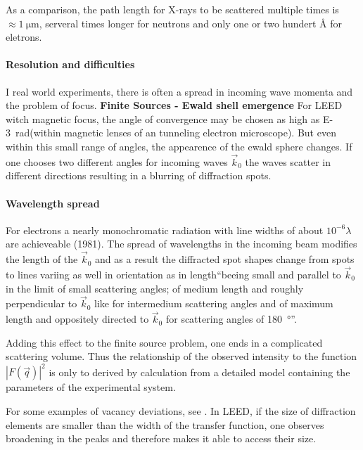 As a comparison, the path length for X-rays to be scattered multiple times is $\approx \SI{1}{\micro \meter}$, serveral times longer for neutrons and only one or two hundert \si{\angstrom} for eletrons\cite[90]{cowley_diffraction_1981}.

\paragraph{Resolution and difficulties}
I real world experiments, there is often a spread in incoming wave momenta and the problem of focus. 
\textbf{Finite Sources - Ewald shell emergence}
For LEED witch magnetic focus, the angle of convergence may be chosen as high as \SI{E-3}{\radian}(within magnetic lenses of an tunneling electron microscope). But even within this small range of angles, the appearence of the ewald sphere changes. If one chooses two different angles for incoming waves $\vec k_0$ the waves scatter in different directions resulting in a blurring of diffraction spots.

\paragraph{Wavelength spread}
For electrons a nearly monochromatic radiation with line widths of about $10^{-6}\lambda$ are achieveable (1981). The spread of wavelengths in the incoming beam modifies the length of the $\vec k_0$ and as a result the diffracted spot shapes change from spots to lines variing as well in orientation as in length\cite[113]{cowley_diffraction_1981}``beeing small and parallel to $\vec k_0$ in the limit of small scattering angles; of medium length and roughly perpendicular to $\vec k_0$ like for intermedium scattering angles and of maximum length and oppositely directed to $\vec k_0$ for scattering angles of \SI{180}{\degree}''.

Adding this effect to the finite source problem, one ends in a complicated scattering volume. Thus the relationship of the observed intensity to the function $|F(\vec q)|^2$ is only to derived by calculation from a detailed model containing the parameters of the experimental system.

For some examples of vacancy deviations, see \cite[144-151]{cowley_diffraction_1981}.
In LEED, if the size of diffraction elements are smaller than the width of the transfer function, one observes broadening in the peaks and therefore makes it able to access their size\cite[40]{liuksiutov_two-dimensional_1992}.

